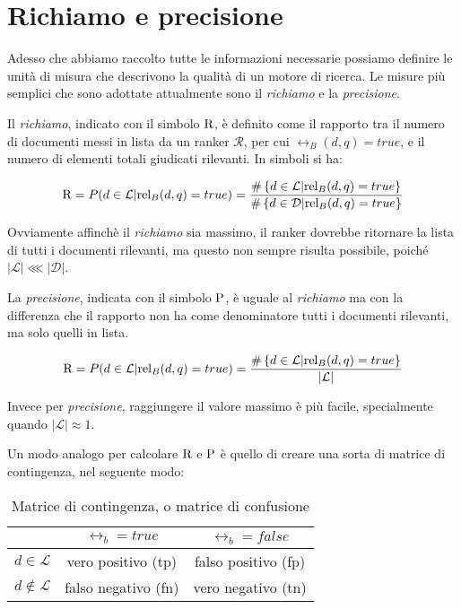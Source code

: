 \section{Richiamo e precisione}

Adesso che abbiamo raccolto tutte le informazioni necessarie possiamo definire
le unità di misura che descrivono la qualità di un motore di ricerca.
Le misure più semplici che sono adottate attualmente sono il \textit{richiamo} e la \textit{precisione}.

\begin{definizione}\label{def:richiamo}
	Il \textit{richiamo}, indicato con il simbolo $\text{R}$, è definito come il rapporto tra il numero di documenti
	messi in lista da  un ranker $\mathcal{R}$, per cui $\rel_B(d,q) = true$,
	e il numero di elementi totali giudicati rilevanti.
	In simboli si ha:
	
	$$
	\text{R} = P(d \in \mathcal{L} | \text{rel}_B(d,q) = true) = \frac{
		\#\left\{ d \in \mathcal{L} | \text{rel}_B(d,q) = true\right\}
	}{
		\#\left\{ d \in \mathcal{D} | \text{rel}_B(d,q) = true\right\}
	}
	$$
\end{definizione}

Ovviamente affinchè il \textit{richiamo} sia massimo, il ranker dovrebbe ritornare la lista di tutti i documenti
rilevanti, ma questo non sempre risulta possibile, poiché $\left|\mathcal{L}\right| \lll \left|\mathcal{D}\right|$.

\begin{definizione}\label{def:precisione}
	La \textit{precisione}, indicata con il simbolo $\text{P}$, è uguale al \textit{richiamo}
	ma con la differenza che il rapporto non ha come denominatore tutti i documenti
	rilevanti, ma solo quelli in lista.
	
	$$
	\text{R} = P(d \in \mathcal{L} | \text{rel}_B(d,q) = true) = \frac{
		\#\left\{ d \in \mathcal{L} | \text{rel}_B(d,q) = true\right\}
	}{
		\left|\mathcal{L}\right|
	}
	$$
\end{definizione}
Invece per \textit{precisione}, raggiungere il valore massimo è più facile, specialmente quando $\left|\mathcal{L}\right| \approx 1$.

\pagebreak

Un modo analogo per calcolare $\text{R}$ e $\text{P}$ è quello di creare una sorta di matrice di contingenza, nel seguente modo:

\begin{table}[h!]
	\centering
	\begin{tabular}{|c|c|c|}
		\hline
		& $\rel_b = true$ & $\rel_b = false$ \\
		\hline
		$d \in \mathcal{L}$ &  vero positivo (tp) & falso positivo (fp) \\
		\hline
		$d \notin \mathcal{L}$ &  falso negativo (fn) & vero negativo (tn) \\
		\hline
	\end{tabular}
	\caption{Matrice di contingenza, o matrice di confusione}
\end{table}

